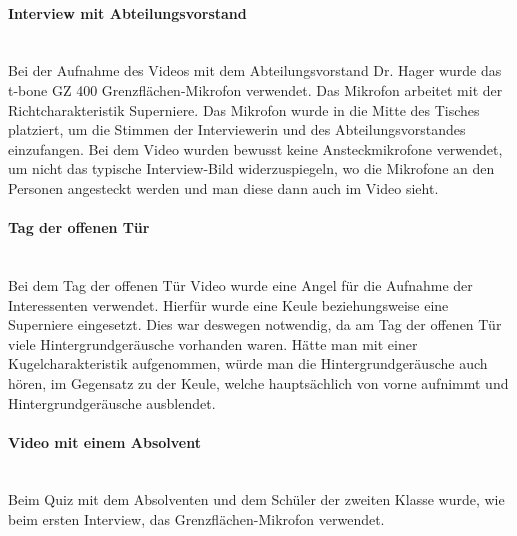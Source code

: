 \paragraph{Interview mit Abteilungsvorstand}
\leavevmode \\
Bei der Aufnahme des Videos mit dem Abteilungsvorstand Dr. Hager wurde das t-bone GZ 400 Grenzflächen-Mikrofon verwendet. Das Mikrofon arbeitet mit der Richtcharakteristik Superniere. Das Mikrofon wurde in die Mitte des Tisches platziert, um die Stimmen der Interviewerin und des Abteilungsvorstandes einzufangen.\newline
Bei dem Video wurden bewusst keine Ansteckmikrofone verwendet, um nicht das typische Interview-Bild widerzuspiegeln, wo die Mikrofone an den Personen angesteckt werden und man diese dann auch im Video sieht.
\paragraph{Tag der offenen Tür}
\leavevmode \\
Bei dem Tag der offenen Tür Video wurde eine Angel für die Aufnahme der Interessenten verwendet. Hierfür wurde eine Keule beziehungsweise eine Superniere eingesetzt. Dies war deswegen notwendig, da am Tag der offenen Tür viele Hintergrundgeräusche vorhanden waren. Hätte man mit einer Kugelcharakteristik aufgenommen, würde man die Hintergrundgeräusche auch hören, im Gegensatz zu der Keule, welche hauptsächlich von vorne aufnimmt und Hintergrundgeräusche ausblendet.
\paragraph{Video mit einem Absolvent}
\leavevmode \\
Beim Quiz mit dem Absolventen und dem Schüler der zweiten Klasse wurde, wie beim ersten Interview, das Grenzflächen-Mikrofon verwendet.